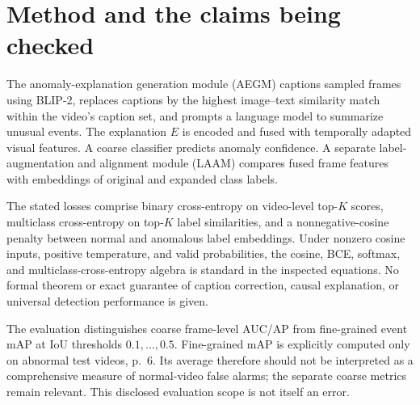 \documentclass[10pt]{article}
\begin{document}
\section*{Method and the claims being checked}
The anomaly-explanation generation module (AEGM) captions sampled frames using BLIP-2, replaces captions by the highest image–text similarity match within the video’s caption set, and prompts a language model to summarize unusual events. The explanation \(E\) is encoded and fused with temporally adapted visual features. A coarse classifier predicts anomaly confidence. A separate label-augmentation and alignment module (LAAM) compares fused frame features with embeddings of original and expanded class labels.\par
The stated losses comprise binary cross-entropy on video-level top-\(K\) scores, multiclass cross-entropy on top-\(K\) label similarities, and a nonnegative-cosine penalty between normal and anomalous label embeddings. Under nonzero cosine inputs, positive temperature, and valid probabilities, the cosine, BCE, softmax, and multiclass-cross-entropy algebra is standard in the inspected equations. No formal theorem or exact guarantee of caption correction, causal explanation, or universal detection performance is given.\par
The evaluation distinguishes coarse frame-level AUC/AP from fine-grained event mAP at IoU thresholds \(0.1,\ldots,0.5\). Fine-grained mAP is explicitly computed only on abnormal test videos, p. 6. Its average therefore should not be interpreted as a comprehensive measure of normal-video false alarms; the separate coarse metrics remain relevant. This disclosed evaluation scope is not itself an error.\par
\end{document}
